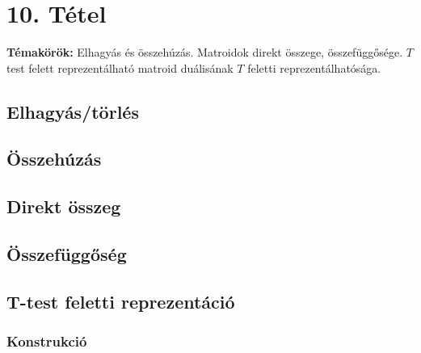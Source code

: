 
\setcounter{chapter}{10}
\chapter*{10. Tétel}

\textbf{Témakörök:} Elhagyás és összehúzás. Matroidok direkt összege, összefüggősége. $T$ test felett reprezentálható matroid duálisának $T$ feletti reprezentálhatósága.

\noindent\hrulefill

\section*{Elhagyás/törlés}



\section*{Összehúzás}



\section*{Direkt összeg}



\section*{Összefüggőség}



\section*{T-test feletti reprezentáció}

\subsection*{Konstrukció}
